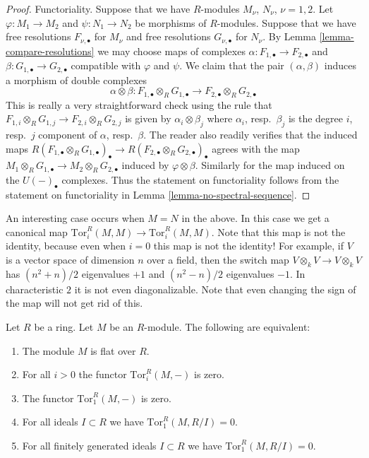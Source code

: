 \begin{proof}
\medskip\noindent
Functoriality. Suppose that we have $R$-modules $M_\nu$, $N_\nu$,
$\nu = 1, 2$. Let $\varphi : M_1 \to M_2$ and $\psi : N_1 \to N_2$
be morphisms of $R$-modules.
Suppose that we have free resolutions $F_{\nu, \bullet}$
for $M_\nu$ and free resolutions $G_{\nu, \bullet}$ for $N_\nu$.
By Lemma \ref{lemma-compare-resolutions} we may choose
maps of complexes $\alpha : F_{1, \bullet} \to F_{2, \bullet}$
and $\beta : G_{1, \bullet} \to G_{2, \bullet}$ compatible
with $\varphi$ and $\psi$. We claim that
the pair $(\alpha, \beta)$ induces a morphism of double
complexes
$$
\alpha \otimes \beta :
F_{1, \bullet} \otimes_R G_{1, \bullet}
\longrightarrow
F_{2, \bullet} \otimes_R G_{2, \bullet}
$$
This is really a very straightforward check using the rule
that $F_{1, i} \otimes_R G_{1, j} \to F_{2, i} \otimes_R G_{2, j}$
is given by $\alpha_i \otimes \beta_j$ where $\alpha_i$, resp.\ 
$\beta_j$ is the degree $i$, resp.\ $j$ component of $\alpha$,
resp.\ $\beta$. The reader also readily verifies that the
induced maps $R(F_{1, \bullet} \otimes_R G_{1, \bullet})_\bullet
\to R(F_{2, \bullet} \otimes_R G_{2, \bullet})_\bullet$
agrees with the map $M_1 \otimes_R G_{1, \bullet}
\to M_2 \otimes_R G_{2, \bullet}$ induced by $\varphi \otimes \beta$.
Similarly for the map induced on the $U(-)_\bullet$ complexes.
Thus the statement on functoriality follows from the statement
on functoriality in Lemma \ref{lemma-no-spectral-sequence}.
\end{proof}

\begin{remark}
\label{remark-curiosity-signs-swap}
An interesting case occurs when $M = N$ in the above.
In this case we get a canonical map $\text{Tor}_i^R(M, M)
\to \text{Tor}_i^R(M, M)$. Note that this map is not the
identity, because even when $i = 0$ this map is not the
identity! For example, if $V$ is a vector space of dimension
$n$ over a field, then the switch map $V \otimes_k V \to V\otimes_k V$
has $(n^2 + n)/2$ eigenvalues $+1$ and $(n^2-n)/2$ eigenvalues
$-1$. In characteristic $2$ it is not even diagonalizable.
Note that even changing the sign of the map will not get rid
of this.
\end{remark}

\begin{lemma}
\label{lemma-characterize-flat}
Let $R$ be a ring. Let $M$ be an $R$-module.
The following are equivalent:
\begin{enumerate}
\item The module $M$ is flat over $R$.
\item For all $i>0$ the functor $\text{Tor}_i^R(M, -)$ is zero.
\item The functor $\text{Tor}_1^R(M, -)$ is zero.
\item For all ideals $I \subset R$ we have $\text{Tor}_1^R(M, R/I) = 0$.
\item For all finitely generated ideals $I \subset R$ we have
$\text{Tor}_1^R(M, R/I) = 0$.
\end{enumerate}
\end{lemma}

